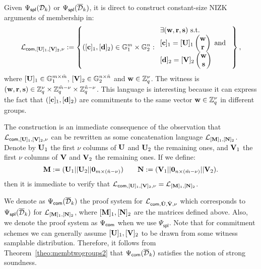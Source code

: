 Given ${\Psi_{\mathsf{spl}}(\mathcal{D}_k)}$ or ${\Psi_\mathsf{spl}(\overline{\mathcal{D}}_k)}$, it is direct to construct constant-size NIZK arguments of membership in:
$$\mathcal{L}_{\mathsf{com},[\mathbf{{U}}]_1,[\mathbf{{V}}]_2,\nu}:=\left\{([\mathbf{c}]_1,[\mathbf{d}]_2) \in \mathbb{G}_1^{m} \times \mathbb{G}_2^{n}:
\begin{array}{l}
    \exists (\mathbf{w},\mathbf{r},\mathbf{s}) \text{ s.t. }\\
    {[\mathbf{c}]_1= [\mathbf{{U}}]_1 \begin{pmatrix} \mathbf{w}\\ \mathbf{r} \end{pmatrix} \text{ and }}\\
    {[\mathbf{d}]_2=[\mathbf{{V}}]_2 \begin{pmatrix} \mathbf{w} \\ \mathbf{s} \end{pmatrix}}
\end{array}
\right\},$$
where $[\mathbf{{U}}]_1\in \mathbb{G}_1^{m \times \tilde{m}}$, 
$[\mathbf{{V}}]_2 \in \mathbb{G}_2^{n \times \tilde{n}}$
and $\mathbf{w} \in \mathbb{Z}_q^{\nu}$. The witness is 
 $(\mathbf{w},\mathbf{r},\mathbf{s}) \in \mathbb{Z}_q^{\nu} \times \mathbb{Z}_q^{\tilde{m}-\nu} \times \mathbb{Z}_q^{\tilde{n}-\nu}$. This language is interesting because it can express the fact that 
$([\mathbf{c}]_1,[\mathbf{d}]_2)$ are commitments to the same vector 
$\mathbf{w} \in \mathbb{Z}_q^{\nu}$ in different groups.
 
The construction is an immediate consequence of the observation 
that $\mathcal{L}_{\mathsf{com},[\mathbf{{U}}]_1,[\mathbf{{V}}]_2,\nu}$  can be rewritten as some concatenation language $\mathcal{L}_{[\mathbf{{M}}]_1,[\mathbf{{N}}]_2}$.
Denote by $\mathbf{{U}}_1$ the first $\nu$ columns of $\mathbf{{U}}$  and $\mathbf{{U}}_2$ the remaining ones, and $\mathbf{{V}}_1$ the first $\nu$ columns of $\mathbf{{V}}$ and $\mathbf{{V}}_2$ the remaining ones. If we define: 
\begin{equation*}
 \mathbf{{M}} := (\mathbf{{U}}_1||\mathbf{{U}}_2||\mathbf{{0}}_{m\times (\tilde{n}-\nu)}) \qquad
\mathbf{{N}} := (\mathbf{{V}}_1||\mathbf{{0}}_{n\times (\tilde{m}- \nu)}||\mathbf{{V}}_2).
\end{equation*}
then it is immediate to verify that $\mathcal{L}_{\mathsf{com},[\mathbf{{U}}]_1,[\mathbf{{V}}]_2,\nu}=\mathcal{L}_{[\mathbf{{M}}]_1,[\mathbf{{N}}]_2}$.

We denote as ${\Psi_{\mathsf{com}}(\overline{\mathcal{D}}_k)}$ the proof 
system for $\mathcal{L}_{\mathsf{com},{\hat{\mathbf{{U}}}},\check{\mathbf{{V}}},\nu}$ which corresponds to ${\Psi_\mathsf{spl}(\overline{\mathcal{D}}_k)}$ for $\mathcal{L}_{[\mathbf{{M}}]_1,[\mathbf{{N}}]_2}$, where $[\mathbf{{M}}]_1,[\mathbf{{N}}]_2$ are the matrices defined above. Also, we denote the proof system as $\Psi_{\mathsf{com}}$ when we use $\Psi_\mathsf{spl}$. Note that for commitment schemes we can generally assume $[\mathbf{{U}}]_1,[\mathbf{{V}}]_2$ to be drawn from some witness samplable distribution. Therefore, it follows from Theorem~\ref{theo:membtwogroups2} that ${\Psi_{\mathsf{com}}(\overline{\mathcal{D}}_k)}$ satisfies the notion of strong soundness.  
